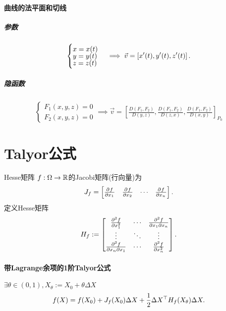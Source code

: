 \paragraph{曲线的法平面和切线}
\subparagraph{参数}
\begin{align*}
	\begin{cases}
		x=x(t) \\[-1ex]
		y=y(t) \\[-1ex]
		z=z(t)
	\end{cases}
	\implies\vec v=\left[x'(t),y'(t),z'(t)\right].
\end{align*}
\subparagraph{隐函数}
\begin{align*}
	\begin{cases}
		F_1(x,y,z)=0 \\
		F_2(x,y,z)=0
	\end{cases}
	\implies\vec v=\left[\frac{D(F_1,F_2)}{D(y,z)},\frac{D(F_1,F_2)}{D(z,x)},\frac{D(F_1,F_2)}{D(x,y)}
		\right]_{P_0}
\end{align*}
\newpage
\section{Talyor公式}
\begin{definition}{Hesse矩阵}{}
	$f:\Omega\to\mathbb R$的Jacobi矩阵(行向量)为
	\begin{align*}
		J_f=
		\begin{bmatrix}
			\frac{\partial^{{}}f}{\partial{x_1}^{{}}} & \frac{\partial^{{}}f}{\partial{x_2}^{{}}} & \cdots & \frac{\partial^{{}}f}{\partial{x_n}^{{}}}
		\end{bmatrix}.
	\end{align*}
	定义Hesse矩阵
	\begin{align*}
		H_f:=
		\begin{bmatrix}
			\frac{\partial^2f}{\partial x_1^2}     & \cdots & \frac{\partial^2f}{\partial x_1\partial x_n} \\
			\vdots                     & \ddots & \vdots                     \\
			\frac{\partial^2f}{\partial x_n\partial x_1} & \cdots & \frac{\partial^2f}{\partial x_n^2}
		\end{bmatrix}.
	\end{align*}
\end{definition}
\paragraph{带Lagrange余项的1阶Talyor公式}
$\exists\theta\in(0,1),X_\theta:=X_0+\theta\Delta X$
\begin{align}
	f(X)=f(X_0)+J_f(X_0)\Delta X+\frac12\Delta X^\top H_f(X_\theta)\Delta X.
\end{align}
